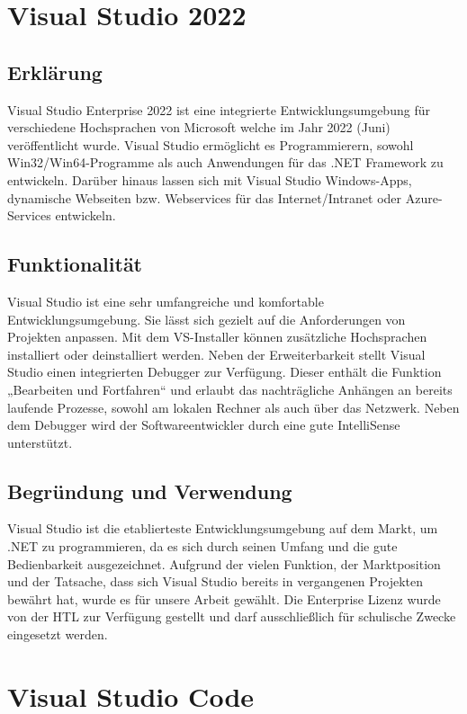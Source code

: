 \section{Visual Studio 2022}
\author{Mirzet sakonjic}
\subsection*{Erklärung}
Visual Studio Enterprise 2022 ist eine integrierte Entwicklungsumgebung für verschiedene Hochsprachen von Microsoft welche im Jahr 2022 (Juni) veröffentlicht wurde.
Visual Studio ermöglicht es Programmierern, sowohl Win32/Win64-Programme als
auch Anwendungen für das .NET Framework zu entwickeln. Darüber hinaus lassen sich
mit Visual Studio Windows-Apps, dynamische Webseiten bzw. Webservices für das
Internet/Intranet oder Azure-Services entwickeln.
\subsection*{Funktionalität}
Visual Studio ist eine sehr umfangreiche und komfortable Entwicklungsumgebung. Sie
lässt sich gezielt auf die Anforderungen von Projekten anpassen. Mit dem VS-Installer
können zusätzliche Hochsprachen installiert oder deinstalliert werden.
Neben der Erweiterbarkeit stellt Visual Studio einen integrierten Debugger zur Verfügung. Dieser enthält die Funktion „Bearbeiten und Fortfahren“ und erlaubt das
nachträgliche Anhängen an bereits laufende Prozesse, sowohl am lokalen Rechner als
auch über das Netzwerk. Neben dem Debugger wird der Softwareentwickler durch eine
gute IntelliSense unterstützt.
\subsection*{Begründung und Verwendung}
Visual Studio ist die etablierteste Entwicklungsumgebung auf dem Markt, um .NET
zu programmieren, da es sich durch seinen Umfang und die gute Bedienbarkeit ausgezeichnet. Aufgrund der vielen Funktion, der Marktposition und der Tatsache, dass
sich Visual Studio bereits in vergangenen Projekten bewährt hat, wurde es für unsere
Arbeit gewählt. Die Enterprise Lizenz wurde von der HTL zur Verfügung gestellt und
darf ausschließlich für schulische Zwecke eingesetzt werden.


\section{Visual Studio Code}
\author{unknown}
\lipsum[10-15]

